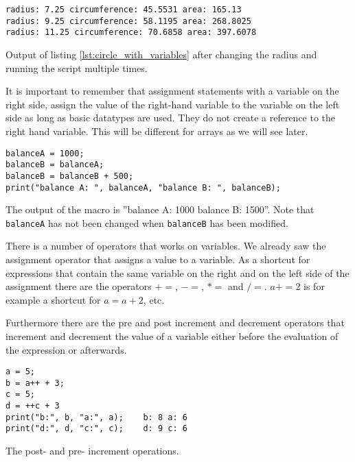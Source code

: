 \begin{listing}[H]
\begin{verbatim}
radius: 7.25 circumference: 45.5531 area: 165.13
radius: 9.25 circumference: 58.1195 area: 268.8025
radius: 11.25 circumference: 70.6858 area: 397.6078
\end{verbatim}
\caption{Output of listing \ref{lst:circle_with_variables} after changing the radius and running the script multiple times.}
\label{lst:circle_with_variables_output}
\end{listing}

It is important to remember that assignment statements with a variable on the right side, assign the value of the right-hand variable to the variable on the left side as long as basic datatypes are used. They do not create a reference to the right hand variable. This will be different for arrays as we will see later. 

\begin{listing}[H]
\begin{verbatim}
balanceA = 1000;
balanceB = balanceA;
balanceB = balanceB + 500;
print("balance A: ", balanceA, "balance B: ", balanceB);
\end{verbatim}
\caption{The output of the macro is ''balance A: 1000 balance B: 1500''. Note that {\tt balanceA} has not been changed when {\tt balanceB} has been modified.}
\label{lst:copy_by_value}
\end{listing}

There is a number of operators that works on variables. We already saw the assignment operator that assigns a value to a variable. As a shortcut for expressions that contain the same variable on the right and on the left side of the assignment there are the operators $+=$, $-=$, $*=$ and $/=$. $a += 2$ is for example a shortcut for $a = a + 2$, etc.

Furthermore there are the pre and post increment and decrement operators that increment and decrement the value of a variable either before the evaluation of the expression or afterwards.

\begin{listing}[H]
\begin{verbatim}
a = 5;
b = a++ + 3;
c = 5;
d = ++c + 3
print("b:", b, "a:", a);	b: 8 a: 6
print("d:", d, "c:", c);	d: 9 c: 6
\end{verbatim}
\caption{The post- and pre- increment operations.}
\label{lst:post_increment}
\end{listing}

